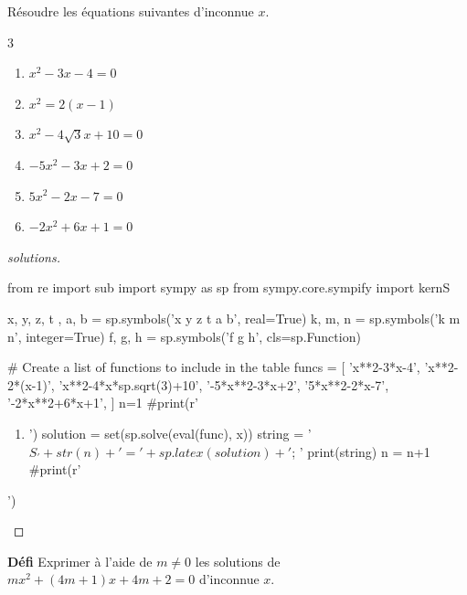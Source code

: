 \documentclass[main.tex]{subfiles}
\begin{document}
\newpage 
{}  
\pagestyle{scrheadings} %
\onehalfspacing
\begin{exercise}[renforcement] \label{chapter03:exercice:formulequadratique} Résoudre les équations suivantes d'inconnue $x$.\hfill 
	\vspace{-1em}
	\begin{multicols}{3}
		\begin{enumerate}[label={$(E_{\arabic*})$}, leftmargin=*]
			\item $x^2-3x-4=0$ 
			\item $x^2=2(x-1)$ 
			\item $x^2-4\sqrt{3}x+10=0$ 
			\item $-5x^2-3x+2=0$ 
			\item $5x^2-2x-7=0$  
			\item $-2x^2+6x+1=0$ 
		\end{enumerate} 
	\end{multicols}  
\end{exercise} 
\begin{proof}[solutions] 
	\scriptsize
\begin{pycode}
from re import sub
import sympy as sp
from sympy.core.sympify import kernS

x, y, z, t , a, b = sp.symbols('x y z t a b', real=True)
k, m, n = sp.symbols('k m n', integer=True)
f, g, h = sp.symbols('f g h', cls=sp.Function)

# Create a list of functions to include in the table
funcs = [
'x**2-3*x-4',
'x**2-2*(x-1)',
'x**2-4*x*sp.sqrt(3)+10',
'-5*x**2-3*x+2',
'5*x**2-2*x-7', 
'-2*x**2+6*x+1',
]
n=1
#print(r' \begin{enumerate}[label={$S_{\arabic*}=$},leftmargin=*] ')
for func in funcs:
	#	print('\item ')
	solution = set(sp.solve(eval(func), x))
	string =  '$S_'+ str(n)+ '=' +  sp.latex(solution ) + '$; '
	print(string)
	n = n+1
#print(r'\end{enumerate}')
\end{pycode}
\scriptsize 
\end{proof}  
\begin{eBox}
	\textbf{Défi}  Exprimer à l'aide de $m\neq0$ les solutions de $mx^2+(4m+1)x+4m+2=0$ d'inconnue $x$.
\end{eBox}
\end{document}
